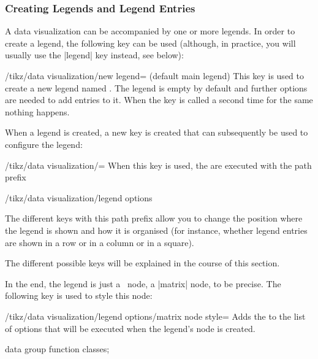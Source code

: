 \subsubsection{Creating Legends and Legend Entries}

A data visualization can be accompanied by one or more legends. In order to
create a legend, the following key can be used (although, in practice, you will
usually use the |legend| key instead, see below):

\begin{key}{/tikz/data visualization/new legend= (default main legend)}
    This key is used to create a new legend named . The
    legend is empty by default and further options are needed to add entries to
    it. When the key is called a second time for the same 
    nothing happens.

    When a legend is created, a new key is created that can subsequently be
    used to configure the legend:
    \begin{key}{/tikz/data visualization/=}
        When this key is used, the  are executed with the path
        prefix
\begin{codeexample}
/tikz/data visualization/legend options
\end{codeexample}
        The different keys with this path prefix allow you to change the
        position where the legend is shown and how it is organised (for
        instance, whether legend entries are shown in a row or in a column or
        in a square).

        The different possible keys will be explained in the course of this
        section.
    \end{key}

    In the end, the legend is just a \tikzname\ node, a |matrix| node, to be
    precise. The following key is used to style this node:

    \begin{key}{/tikz/data visualization/legend options/matrix node style=}
        Adds the  to the list of options that will be executed
        when the legend's node is created.
\begin{codeexample}[width=8cm]
\tikz \datavisualization [
  scientific axes,
  visualize as smooth line/.list=
    {log, lin, squared, exp},
  legend={matrix node style={fill=black!25}},
  log=    {label in legend={text=$\log x$}},
  lin=    {label in legend={text=$x/2$}},
  squared={label in legend={text=$x^2$}},
  exp=    {label in legend={text=$e^x$}},
  style sheet=vary dashing]
data group {function classes};
\end{codeexample}
    \end{key}


\end{key}
